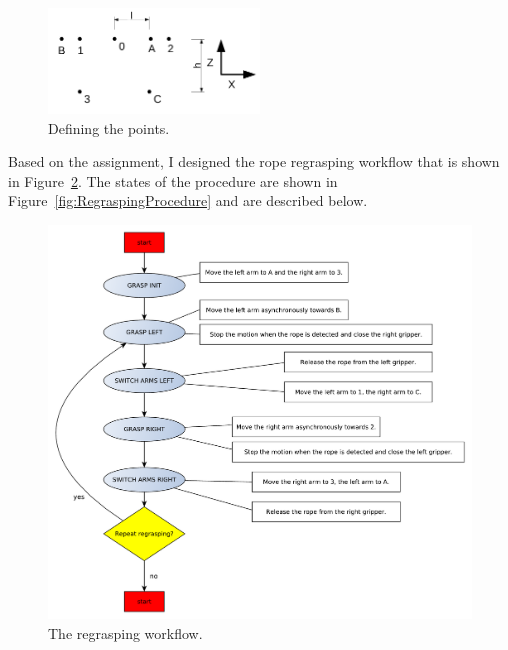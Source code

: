        \begin{figure}[h]
        \includegraphics[width=0.5\textwidth]{GraspPoses.pdf}
        \centering
        \caption{Defining the points.}
        \label{fig:GraspPoses}
        \end{figure}

        Based on the assignment, I designed the rope regrasping workflow that is shown in Figure~\ref{fig:RegraspingWorkflow}. The states of the procedure are shown in Figure~\ref{fig:RegraspingProcedure} and are described below.

        \begin{figure}
        \includegraphics[width=1.0\textwidth]{RegraspingWorkflow.pdf}
        \centering
        \caption{The regrasping workflow.}
        \label{fig:RegraspingWorkflow}
        \end{figure}


